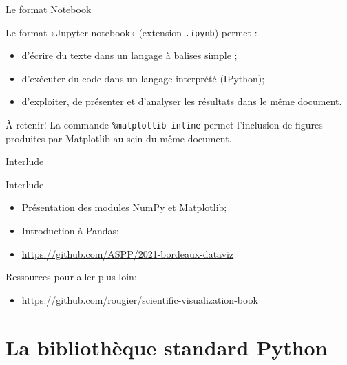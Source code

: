 \documentclass[dvipsnames]{beamer}
\def\interlude{
\begin{frame}[standout]
Interlude\\[1em]
    \centerline{\decothreeleft\;\rotatebox[origin=c]{180}{\decothreeleft}}
\end{frame}
}
\begin{document}
\begin{frame}
    [fragile]{Le format Notebook}

    Le format «Jupyter notebook» (extension \texttt{.ipynb}) permet :
    \begin{itemize}
        \item d'écrire du texte dans un langage à balises simple ;
        \item d'exécuter du code dans un langage interprété (IPython);
        \item d'exploiter, de présenter et d'analyser les résultats dans le
              même document.
    \end{itemize}

    \begin{alertblock} {À retenir!}
        \vspace{.5em}
        La commande \texttt{\%matplotlib inline} permet l'inclusion de figures
        produites par Matplotlib au sein du même document.
    \end{alertblock}

\end{frame}

\interlude

\begin{frame}
    [fragile]{Interlude}

    \begin{itemize}
        \item Présentation des modules NumPy et Matplotlib;
        \item Introduction à Pandas;
        \item \footnotesize\url{https://github.com/ASPP/2021-bordeaux-dataviz}
    \end{itemize}

    Ressources pour aller plus loin:
    \begin{itemize}
        \item \footnotesize\url{https://github.com/rougier/scientific-visualization-book} 
    \end{itemize}

\end{frame}


\section{La bibliothèque standard Python}
\end{document}
